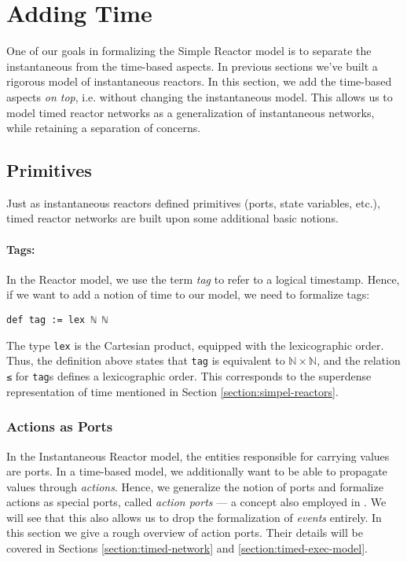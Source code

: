 \section{Adding Time}
\label{section:time}

One of our goals in formalizing the Simple Reactor model is to separate the instantaneous from the time-based aspects.
In previous sections we've built a rigorous model of instantaneous reactors.
In this section, we add the time-based aspects \emph{on top}, i.e. without changing the instantaneous model.
This allows us to model timed reactor networks as a generalization of instantaneous networks, while retaining a separation of concerns.

\subsection{Primitives}
\label{section:time-primitives}

Just as instantaneous reactors defined primitives (ports, state variables, etc.), timed reactor networks are built upon some additional basic notions.

\paragraph{Tags:} In the Reactor model, we use the term \emph{tag} to refer to a logical timestamp. 
Hence, if we want to add a notion of time to our model, we need to formalize tags:

\begin{lstlisting}
def tag := lex ℕ ℕ
\end{lstlisting}

\noindent The type \lstinline{lex} is the Cartesian product, equipped with the lexicographic order.
Thus, the definition above states that \lstinline{tag} is equivalent to $\mathbb{N} \times \mathbb{N}$, and the relation \verb|≤| for \lstinline{tag}s defines a lexicographic order.
This corresponds to the superdense representation of time \cite{dense} mentioned in Section \ref{section:simpel-reactors}.

\subsubsection{Actions as Ports}

In the Instantaneous Reactor model, the entities responsible for carrying values are ports. 
In a time-based model, we additionally want to be able to propagate values through \emph{actions}.
Hence, we generalize the notion of ports and formalize actions as special ports, called \emph{action ports} --- a concept also employed in \cite{marten}.
We will see that this also allows us to drop the formalization of \emph{events} entirely.
In this section we give a rough overview of action ports.
Their details will be covered in Sections \ref{section:timed-network} and \ref{section:timed-exec-model}.

